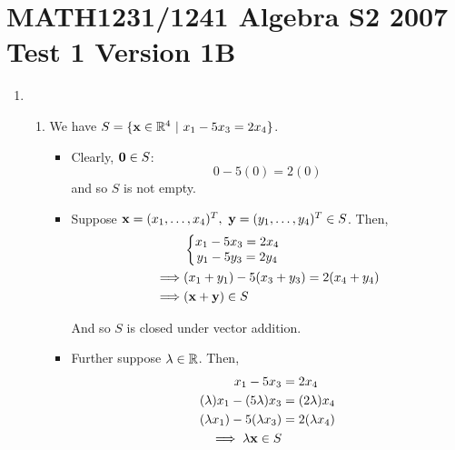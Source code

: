 \section*{MATH1231/1241 Algebra S2 2007 Test 1 Version 1B}
\begin{enumerate}
    \item
        \begin{enumerate}
            \item 
                We have $S = \{\mathbf{x} \in \mathbb{R}^4 ~|~ x_1 - 5x_3 = 2x_4\}$.

                \begin{itemize}
                    \item
                        Clearly, $\mathbf{0} \in S$:
                        $$0 - 5(0) = 2(0)$$
                        and so $S$ is not empty.

                    \item
                        Suppose $\mathbf{x} = (x_1, \dots, x_4)^T,~
                        \mathbf{y} = (y_1, \dots, y_4)^T \in S$. Then,
                        \begin{align*}
                            &\left\{\begin{matrix}
                                x_1 - 5x_3 = 2x_4 \\
                                y_1 - 5y_3 = 2y_4
                            \end{matrix}\right. \\
                            \implies
                            &(x_1 + y_1) - 5(x_3 + y_3) = 2(x_4 + y_4) \\
                            \implies
                            &(\mathbf{x} + \mathbf{y}) \in S
                        \end{align*}

                        And so $S$ is closed under vector addition.

                    \item
                        Further suppose $\lambda \in \mathbb{R}$.
                        Then,
                        \begin{align*}
                            x_1 - 5x_3 &= 2x_4 \\
                            (\lambda)x_1 - (5\lambda)x_3 &= (2\lambda)x_4 \\
                            (\lambda x_1) - 5(\lambda x_3) &= 2(\lambda x_4) \\
                            \implies
                            \lambda \mathbf{x} \in S
                        \end{align*}


\end{itemize}
\end{enumerate}
\end{enumerate}
